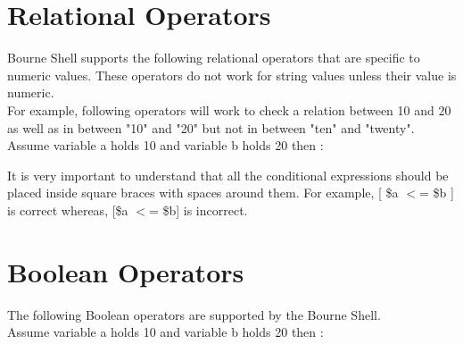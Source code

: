 \documentclass{article}
\begin{document}
\section*{Relational Operators}
Bourne Shell supports the following relational operators that are specific to numeric values. These operators do not work for string values unless their value is numeric.\\
For example, following operators will work to check a relation between 10 and 20 as well as in between "10" and "20" but not in between "ten" and "twenty".\\
Assume variable a holds 10 and variable b holds 20 then :\\
\begin{center}
\end{center}
It is very important to understand that all the conditional expressions should be placed inside square braces with spaces around them. For example, [ \$a $<$= \$b ] is correct whereas, [\$a $<$= \$b] is incorrect.\\

\section*{Boolean Operators}
The following Boolean operators are supported by the Bourne Shell.\\
Assume variable a holds 10 and variable b holds 20 then :\\
\begin{center}
\end{center}
\end{document}
